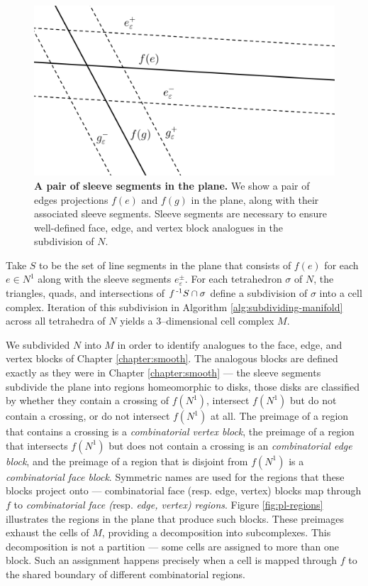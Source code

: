 \begin{figure}[h!]
	\centering
	\includegraphics[width=\textwidth]{figures/pl-sleeves.png}
	\caption{
		\textbf{A pair of sleeve segments in the plane.}
		We show a pair of edges projections $f(e)$ and $f(g)$ in the plane, along with their associated sleeve segments.
		Sleeve segments are necessary to ensure well-defined face, edge, and vertex block analogues in the subdivision of $N$.
	}
	\label{fig:pl-sleeves}
\end{figure}

Take $S$ to be the set of line segments in the plane that consists of $f(e)$ for each $e\in N^1$ along with the sleeve segments $e_\varepsilon^\pm$.
For each tetrahedron $\sigma$ of $N$, the triangles, quads, and intersections of $f^{\,\text{-}1} S\cap\sigma$ define a subdivision of $\sigma$ into a cell complex.
Iteration of this subdivision in Algorithm \ref{alg:subdividing-manifold} across all tetrahedra of $N$ yields a 3--dimensional cell complex $M$.

We subdivided $N$ into $M$ in order to identify analogues to the face, edge, and vertex blocks of Chapter \ref{chapter:smooth}.
The analogous blocks are defined exactly as they were in Chapter \ref{chapter:smooth} --- the sleeve segments subdivide the plane into regions homeomorphic to disks, those disks are classified by whether they contain a crossing of $f(N^1)$, intersect $f(N^1)$ but do not contain a crossing, or do not intersect $f(N^1)$ at all.
The preimage of a region that contains a crossing is a \emph{combinatorial vertex block}, the preimage of a region that intersects $f(N^1)$ but does not contain a crossing is an \emph{combinatorial edge block}, and the preimage of a region that is disjoint from $f(N^1)$ is a \emph{combinatorial face block}.
Symmetric names are used for the regions that these blocks project onto --- combinatorial face (resp. edge, vertex) blocks map through $f$ to \emph{combinatorial face (}resp. \emph{edge, vertex) regions}.
Figure \ref{fig:pl-regions} illustrates the regions in the plane that produce such blocks.
These preimages exhaust the cells of $M$, providing a decomposition into subcomplexes.
This decomposition is not a partition --- some cells are assigned to more than one block.
Such an assignment happens precisely when a cell is mapped through $f$ to the shared boundary of different combinatorial regions.


